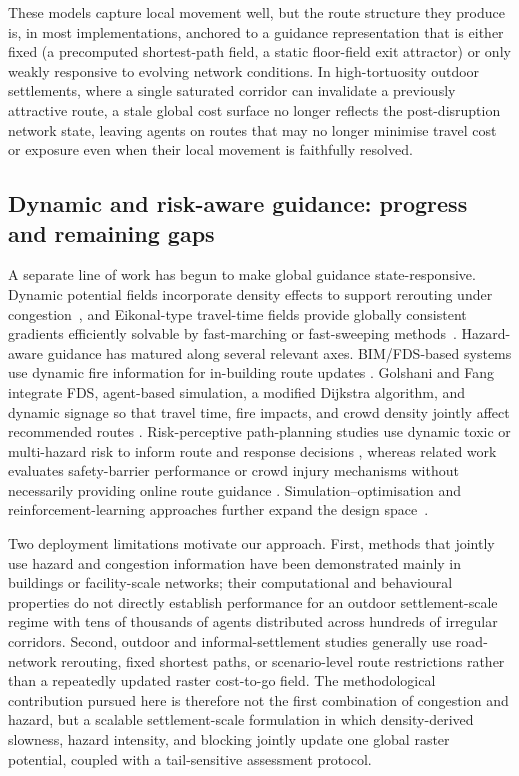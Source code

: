 \documentclass[preprint,12pt]{elsarticle}
\providecommand{\FloatBarrier}{}
\let\origsubsection\subsection
\renewcommand{\subsection}{\FloatBarrier\origsubsection}
\begin{document}
These models capture local movement well, but the route structure they
produce is, in most implementations, anchored to a guidance representation
that is either fixed (a precomputed shortest-path field, a static
floor-field exit attractor) or only weakly responsive to evolving network
conditions. In high-tortuosity outdoor settlements, where a single
saturated corridor can invalidate a previously attractive route, a stale
global cost surface no longer reflects the post-disruption network state,
leaving agents on routes that may no longer minimise travel cost or
exposure even when their local movement is faithfully resolved.

\subsection{Dynamic and risk-aware guidance: progress and remaining gaps}
\label{sec:rw_nav}

A separate line of work has begun to make global guidance state-responsive.
Dynamic potential fields incorporate density effects to support rerouting
under congestion~\citep{Kretz2009DynamicPotential}, and Eikonal-type
travel-time fields provide globally consistent gradients efficiently
solvable by fast-marching or fast-sweeping
methods~\citep{Sethian1996FastMarching,Zhao2005FastSweeping}. Hazard-aware
guidance has matured along several relevant axes. BIM/FDS-based systems use
dynamic fire information for in-building route updates
\citep{Ding2024BIMFireEvac}. Golshani and Fang integrate FDS, agent-based
simulation, a modified Dijkstra algorithm, and dynamic signage so that travel
time, fire impacts, and crowd density jointly affect recommended routes
\citep{Golshani2025FireNavigation}. Risk-perceptive path-planning studies use
dynamic toxic or multi-hazard risk to inform route and response decisions
\citep{He2024RiskPerceptionPath,He2024DynamicMultiHazardEvac,Luan2025ToxicGasAirport,Yang2025MetroStampede},
whereas related work evaluates safety-barrier performance or crowd injury
mechanisms without necessarily providing online route guidance
\citep{Yuan2022SafetyBarrierEvac,Guo2024StampedeTerrorist}.
Simulation--optimisation and reinforcement-learning approaches further
expand the design
space~\citep{Zhang2024SimOptGuidance,Huang2023DSA_DDQN}.

Two deployment limitations motivate our approach. First, methods that jointly
use hazard and congestion information have been demonstrated mainly in
buildings or facility-scale networks; their computational and behavioural
properties do not directly establish performance for an outdoor
settlement-scale regime with tens of thousands of agents distributed across
hundreds of irregular corridors. Second, outdoor and informal-settlement
studies generally use road-network rerouting, fixed shortest paths, or
scenario-level route restrictions rather than a repeatedly updated raster
cost-to-go field. The methodological contribution pursued here is therefore
not the first combination of congestion and hazard, but a scalable
settlement-scale formulation in which density-derived slowness, hazard
intensity, and blocking jointly update one global raster potential, coupled
with a tail-sensitive assessment protocol.
\end{document}

